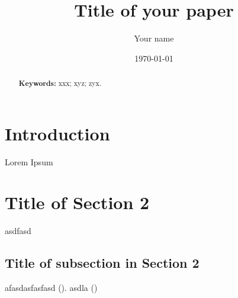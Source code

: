 \documentclass[11pt]{article}
\title{Title of your paper}
\author{Your name}
\date{\today}
\begin{document}
\maketitle


\begin{abstract}
	\singlespacing
	\noindent 
	
	\noindent \textbf{Keywords:} xxx; xyz; zyx. 
\end{abstract}


\section{Introduction}
Lorem Ipsum
\section{Title of Section 2}
asdfasd
\subsection{Title of subsection in Section 2}
afasdasfasfasd (\cite{Landrigan.2017}). asdla (\cite{Test.01012022})
\end{document}

